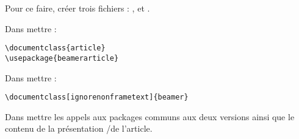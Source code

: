 Pour ce faire, créer trois fichiers :  ,  et .

Dans  mettre :

\begin{verbatim}
\documentclass{article}
\usepackage{beamerarticle}

\end{verbatim}

Dans  mettre :

\begin{verbatim}
\documentclass[ignorenonframetext]{beamer}

\end{verbatim}

Dans  mettre les appels aux packages communs aux deux versions ainsi que le contenu de la présentation /de l'article.



